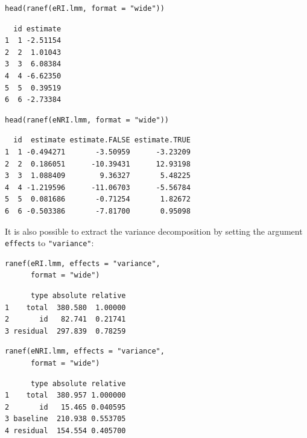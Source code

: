 \documentclass[12pt]{article}
\begin{document}
\bigskip

\begin{minipage}{0.48\linewidth}
\lstset{language=r,label= ,caption= ,captionpos=b,numbers=none}
\begin{lstlisting}
head(ranef(eRI.lmm, format = "wide"))
\end{lstlisting}

\begin{verbatim}
  id estimate
1  1 -2.51154
2  2  1.01043
3  3  6.08384
4  4 -6.62350
5  5  0.39519
6  6 -2.73384
\end{verbatim}

\end{minipage}
\begin{minipage}{0.48\linewidth}
\lstset{language=r,label= ,caption= ,captionpos=b,numbers=none}
\begin{lstlisting}
head(ranef(eNRI.lmm, format = "wide"))
\end{lstlisting}

\begin{verbatim}
  id  estimate estimate.FALSE estimate.TRUE
1  1 -0.494271       -3.50959      -3.23209
2  2  0.186051      -10.39431      12.93198
3  3  1.088409        9.36327       5.48225
4  4 -1.219596      -11.06703      -5.56784
5  5  0.081686       -0.71254       1.82672
6  6 -0.503386       -7.81700       0.95098
\end{verbatim}

\end{minipage}


It is also possible to extract the variance decomposition by setting
the argument \texttt{effects} to \texttt{"variance"}:

\medskip

\begin{minipage}{0.47\linewidth}
\lstset{language=r,label= ,caption= ,captionpos=b,numbers=none}
\begin{lstlisting}
ranef(eRI.lmm, effects = "variance",
      format = "wide")
\end{lstlisting}

\begin{verbatim}
      type absolute relative
1    total  380.580  1.00000
2       id   82.741  0.21741
3 residual  297.839  0.78259

\end{verbatim}

\end{minipage}
\begin{minipage}{0.47\linewidth}
\lstset{language=r,label= ,caption= ,captionpos=b,numbers=none}
\begin{lstlisting}
ranef(eNRI.lmm, effects = "variance",
      format = "wide")
\end{lstlisting}

\begin{verbatim}
      type absolute relative
1    total  380.957 1.000000
2       id   15.465 0.040595
3 baseline  210.938 0.553705
4 residual  154.554 0.405700
\end{verbatim}

\end{minipage}
\end{document}
